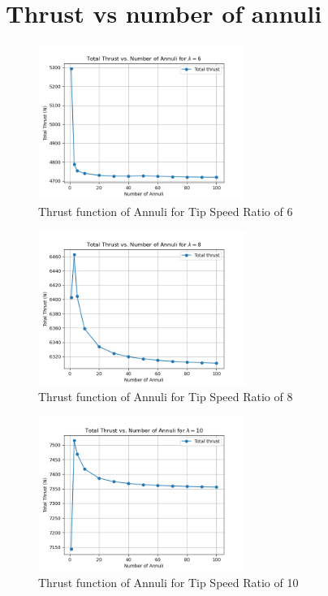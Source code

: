 \section{Thrust vs number of annuli}
\begin{figure}[H]
    \centering
    \includegraphics[width=0.6\textwidth]{Figures/annuli_6.png}
    \caption{Thrust function of Annuli for Tip Speed Ratio of 6}
    \label{fig:thrust function of annuli - lambda 6}
\end{figure}
\begin{figure}[H]
    \centering
    \includegraphics[width=0.6\textwidth]{Figures/annuli_8.png}
    \caption{Thrust function of Annuli for Tip Speed Ratio of 8}
    \label{fig:thrust function of annuli - lambda 8}
\end{figure}
\begin{figure}[H]
    \centering
    \includegraphics[width=0.6\textwidth]{Figures/annuli_10.png}
    \caption{Thrust function of Annuli for Tip Speed Ratio of 10}
    \label{fig:thrust function of annuli - lambda 10}
\end{figure}

